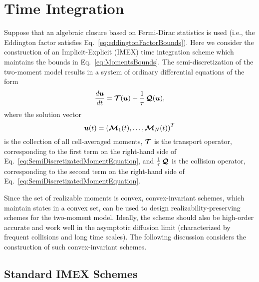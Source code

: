 \clearpage
\section{Time Integration} \label{se:TimeIntegration}

Suppose that an algebraic closure based on Fermi-Dirac statistics is used (i.e., the Eddington factor satisfies Eq.~\eqref{eq:eddingtonFactorBounds}).
Here we consider the construction of an Implicit-Explicit (IMEX) time integration scheme which maintains the bounds in Eq.~\eqref{eq:MomentsBounds}.  
The semi-discretization of the two-moment model results in a system of ordinary differential equations of the form
\begin{equation}
  \dfrac{d \boldsymbol{u}}{d t} = \boldsymbol{\mathcal{T}}(\boldsymbol{u}) + \frac{1}{\tau}\,\boldsymbol{\mathcal{Q}}(\boldsymbol{u}),
\end{equation}
where the solution vector
\begin{equation}
  \boldsymbol{u}(t) = \left( \boldsymbol{\mathcal{M}}_{1}(t),\ldots,\boldsymbol{\mathcal{M}}_{N}(t)\right) ^{T}
\end{equation}
is the collection of all cell-averaged moments, $\boldsymbol{\mathcal{T}}$ is the transport operator, corresponding to the first term on the right-hand side of Eq.~\eqref{eq:SemiDiscretizatedMomentEquation}, and $\frac{1}{\tau}\,\boldsymbol{\mathcal{Q}}$ is the collision operator, corresponding to the second term on the right-hand side of Eq.~\eqref{eq:SemiDiscretizatedMomentEquation}.  

Since the set of realizable moments is convex, convex-invariant schemes, which maintain states in a convex set, can be used to design realizability-preserving schemes for the two-moment model. 
Ideally, the scheme should also be high-order accurate and work well in the asymptotic diffusion limit (characterized by frequent collisions and long time scales).  
The following discussion considers the construction of such convex-invariant schemes.  

\subsection{Standard IMEX Schemes}

